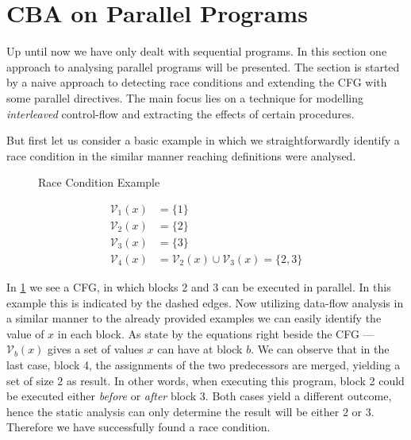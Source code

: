 \documentclass[article]{uibk}
\begin{document}
\newpage

\section{CBA on Parallel Programs}

Up until now we have only dealt with sequential programs. In this section one
approach to analysing parallel programs will be presented. The section is
started by a naive approach to detecting race conditions and extending the CFG
with some parallel directives. The main focus lies on a technique for modelling
\textit{interleaved} control-flow and extracting the effects of certain
procedures.

But first let us consider a basic example in which we straightforwardly
identify a race condition in the similar manner reaching definitions were
analysed.

\vspace{-1em}
\begin{minipage}[t]{0.45\textwidth}
    \begin{figure}[H]
        \centering
        
        \caption{Race Condition Example}
        \label{fig:race_condition}
    \end{figure}
\end{minipage}
\begin{minipage}[t]{0.45\textwidth}
    \vspace{2em}
    \begin{align*}
        \mathcal{V}_1(x) &= \{1\} \\
        \mathcal{V}_2(x) &= \{2\} \\
        \mathcal{V}_3(x) &= \{3\} \\
        \mathcal{V}_4(x) &= \mathcal{V}_2(x) \cup \mathcal{V}_3(x) = \{2,3\}
    \end{align*}
\end{minipage}
\vspace{1em}

In \cref{fig:race_condition} we see a CFG, in which blocks 2 and 3 can be
executed in parallel. In this example this is indicated by the dashed edges.
Now utilizing data-flow analysis in a similar manner to the already provided
examples we can easily identify the value of $x$ in each block. As state by the
equations right beside the CFG --- $\mathcal{V}_b(x)$ gives a set of values
$x$ can have at block $b$. We can observe that in the last case, block 4, the
assignments of the two predecessors are merged, yielding a set of size $2$ as
result. In other words, when executing this program, block 2 could be executed
either \emph{before} or \emph{after} block 3. Both cases yield a different
outcome, hence the static analysis can only determine the result will be either
$2$ or $3$. Therefore we have successfully found a race condition.
\end{document}
